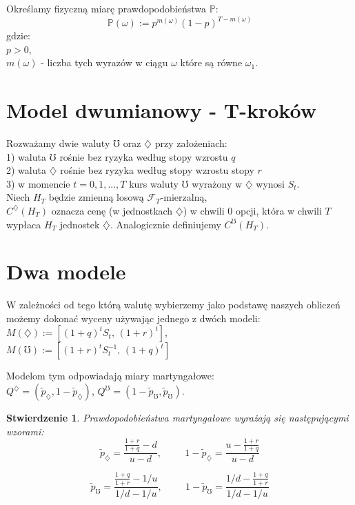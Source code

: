 \documentclass[11pt]{report}
\newtheorem{stw}{Stwierdzenie}[chapter]
\begin{document}
              
Określamy fizyczną miarę prawdopodobieństwa $\mathbb{P}$:
$$\mathbb{P}(\omega) := p^{m(\omega)}(1-p)^{T-m(\omega)}  $$
 gdzie: \\
$p >0$, \\
$m(\omega)$ - liczba tych wyrazów w ciągu $\omega$ które są równe $\omega_1$.               

\section*{Model dwumianowy - T-kroków}



Rozważamy dwie waluty $\mho$ oraz $\diamondsuit$ przy założeniach:   \\
1) waluta $\mho$ rośnie bez ryzyka według stopy wzrostu $q$  \\
2) waluta $\diamondsuit$ rośnie bez ryzyka według stopy wzrostu stopy $r$  \\
3) w momencie $t=0,1,...,T$ kurs waluty $\mho$ wyrażony w $\diamondsuit$ wynosi $S_t$. \\



Niech $H_T$ będzie zmienną losową $\mathscr{F}_T$-mierzalną, \\
$C^{\diamondsuit}(H_T)$ oznacza cenę (w jednostkach $\diamondsuit$) w chwili $0$ opcji, która w chwili $T$ wypłaca $H_T$ jednostek $\diamondsuit$. Analogicznie definiujemy $C^{\mho}(H_T)$.

\section{Dwa modele}
W zależności od tego którą walutę wybierzemy jako podstawę naszych obliczeń możemy dokonać wyceny używając jednego z dwóch modeli: \\
$M(\diamondsuit) := \left[ (1+q)^t S_t, \, (1+r)^t \right]$, \\
 $M(\mho) := \left[ (1+r)^t S^{-1}_t, \, (1+q)^t \right]$

\vspace{0.3cm} 
Modelom tym odpowiadają miary martyngałowe: \\
$Q^{\diamondsuit} = (\tilde{p}_{\diamondsuit},1-\tilde{p}_{\diamondsuit})$, $Q^{\mho} = (1-\tilde{p}_{\mho}, \tilde{p}_{\mho})$. 
\begin{stw} Prawdopodobieństwa martyngałowe wyrażają się następującymi wzorami:
\begin{equation*}
\tilde{p}_{\diamondsuit} = \frac{\frac{1+r}{1+q}-d}{u-d}, \hspace{1cm}
1 - \tilde{p}_{\diamondsuit} =  \frac{u-\frac{1+r}{1+q}}{u-d}
\end{equation*}

\begin{equation*} 
\tilde{p}_{\mho} =  \frac{\frac{1+q}{1+r} - 1/u}{1/d-1/u}, \hspace{1cm}   
 1-\tilde{p}_{\mho} = \frac{1/d - \frac{1+q}{1+r}}{1/d-1/u}
 \end{equation*}

\end{stw}
\end{document}
